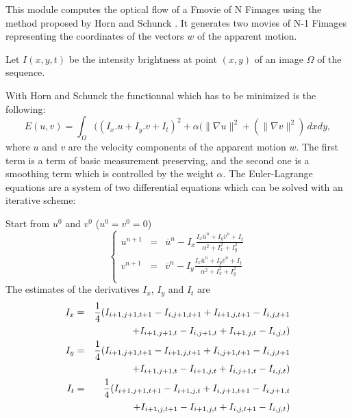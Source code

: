
This module computes the optical flow of a Fmovie of N Fimages 
using the method proposed by Horn and Schunck \cite{horn.schunck:of}. 
It generates two movies of N-1 Fimages representing the coordinates
of the vectors $w$ of the apparent motion.

Let $I(x,y,t)$ be the intensity brightness at point $(x,y)$ 
of an image $\Omega$ of the sequence. 

With Horn and Schunck the functionnal which has to be minimized 
is the following:
$$
E(u,v) = \int_\Omega( {(I_x.u+I_y.v+I_t)}^2 + \alpha(\|\nabla u\|^2 + (\|\nabla v\|^2 )\, dxdy ,
$$
where $u$ and $v$ are the velocity components of the apparent motion $w$. 
The first term is a term of basic measurement preserving, and the second one is a smoothing term which is controlled by the weight $\alpha$.
 The Euler-Lagrange equations are a system of two differential equations which can be solved with an iterative scheme:

Start from $u^0$ and $v^0$ ($u^0 = v^0 =0$)
$$
\left\{ \begin{array}{ccc}
u^{n+1} &=& \overline{u}^n - I_x\displaystyle{\frac{I_x\overline{u}^n + I_y\overline{v}^n +I_t}{{\alpha}^2 + I^2_x+ I^2_y}}\\
v^{n+1} &=& \overline{v}^n - I_y\displaystyle{\frac{I_x\overline{u}^n + I_y\overline{v}^n +I_t}{{\alpha}^2 + I^2_x+ I^2_y}}\\
\end{array}\right.
$$
The estimates of the derivatives $I_x$, $I_y$ and $I_t$ are
\begin{eqnarray*}
I_x & = &\frac{1}{4} ( I_{i+1,j+1,t+1} - I_{i,j+1,t+1} +I_{i+1,j,t+1} -I_{i,j,t+1}\\
& &\ + I_{i+1,j+1,t} -I_{i,j+1,t} +I_{i+1,j,t} - I_{i,j,t})
\vspace*{0.3cm}\\
I_y &= &\frac{1}{4}\displaystyle{(} I_{i+1,j+1,t+1} - I_{i+1,j,t+1} +I_{i,j+1,t+1} -I_{i,j,t+1}\\ 
& &\  + I_{i+1,j+1,t} -I_{i+1,j,t} +I_{i,j+1,t} - I_{i,j,t})
\vspace*{0.3cm}\\
I_t &= & \frac{1}{4}\displaystyle{(} I_{i+1,j+1,t+1} - I_{i+1,j,t} +I_{i,j+1,t+1} -I_{i,j+1,t}\\
& &\ + I_{i+1,j,t+1} -I_{i+1,j,t} +I_{i,j,t+1} - I_{i,j,t})\\
\end{eqnarray*}


